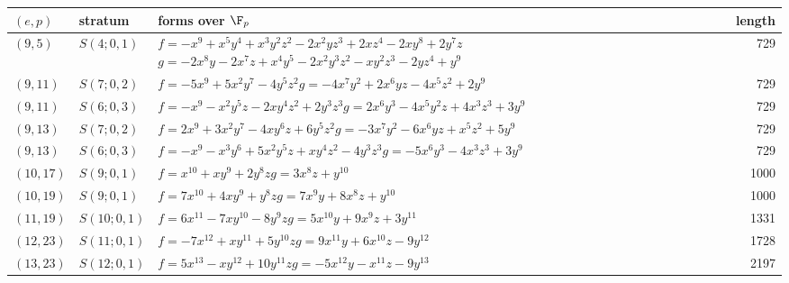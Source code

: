 \begin{tabular}{@{}ll>{\raggedright\arraybackslash}p{6.4cm}r@{}}
\toprule
$(e,p)$ & stratum & forms over $\F_p$ & length\\
\midrule
$(9,5)$ & $S(4;0,1)$ & $f=-x^{9} + x^{5}y^{4} + x^{3}y^{2}z^{2} - 2x^{2}yz^{3} + 2xz^{4} - 2xy^{8} + 2y^{7}z$\newline $g=-2x^{8}y - 2x^{7}z + x^{4}y^{5} - 2x^{2}y^{3}z^{2} - xy^{2}z^{3} - 2yz^{4} + y^{9}$ & 729\\
$(9,11)$ & $S(7;0,2)$ & $f=-5x^{9} + 5x^{2}y^{7} - 4y^{5}z^{2}$\newline $g=-4x^{7}y^{2} + 2x^{6}yz - 4x^{5}z^{2} + 2y^{9}$ & 729\\
$(9,11)$ & $S(6;0,3)$ & $f=-x^{9} - x^{2}y^{5}z - 2xy^{4}z^{2} + 2y^{3}z^{3}$\newline $g=2x^{6}y^{3} - 4x^{5}y^{2}z + 4x^{3}z^{3} + 3y^{9}$ & 729\\
$(9,13)$ & $S(7;0,2)$ & $f=2x^{9} + 3x^{2}y^{7} - 4xy^{6}z + 6y^{5}z^{2}$\newline $g=-3x^{7}y^{2} - 6x^{6}yz + x^{5}z^{2} + 5y^{9}$ & 729\\
$(9,13)$ & $S(6;0,3)$ & $f=-x^{9} - x^{3}y^{6} + 5x^{2}y^{5}z + xy^{4}z^{2} - 4y^{3}z^{3}$\newline $g=-5x^{6}y^{3} - 4x^{3}z^{3} + 3y^{9}$ & 729\\
$(10,17)$ & $S(9;0,1)$ & $f=x^{10} + xy^{9} + 2y^{8}z$\newline $g=3x^{8}z + y^{10}$ & 1000\\
$(10,19)$ & $S(9;0,1)$ & $f=7x^{10} + 4xy^{9} + y^{8}z$\newline $g=7x^{9}y + 8x^{8}z + y^{10}$ & 1000\\
$(11,19)$ & $S(10;0,1)$ & $f=6x^{11} - 7xy^{10} - 8y^{9}z$\newline $g=5x^{10}y + 9x^{9}z + 3y^{11}$ & 1331\\
$(12,23)$ & $S(11;0,1)$ & $f=-7x^{12} + xy^{11} + 5y^{10}z$\newline $g=9x^{11}y + 6x^{10}z - 9y^{12}$ & 1728\\
$(13,23)$ & $S(12;0,1)$ & $f=5x^{13} - xy^{12} + 10y^{11}z$\newline $g=-5x^{12}y - x^{11}z - 9y^{13}$ & 2197\\
\bottomrule
\end{tabular}
